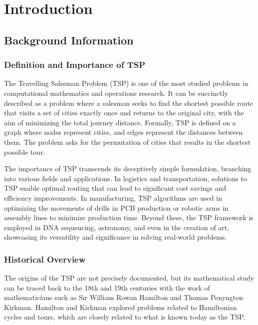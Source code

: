 \chapter{Introduction}\label{chapt:1}
\label{introduction}

\section{Background Information}

\subsection{Definition and Importance of TSP}
The Travelling Salesman Problem (TSP) is one of the most studied problems in computational mathematics and operations research. It can be succinctly described as a problem where a salesman seeks to find the shortest possible route that visits a set of cities exactly once and returns to the original city, with the aim of minimizing the total journey distance. Formally, TSP is defined on a graph where nodes represent cities, and edges represent the distances between them. The problem asks for the permutation of cities that results in the shortest possible tour.

The importance of TSP transcends its deceptively simple formulation, branching into various fields and applications. In logistics and transportation, solutions to TSP enable optimal routing that can lead to significant cost savings and efficiency improvements. In manufacturing, TSP algorithms are used in optimizing the movements of drills in PCB production or robotic arms in assembly lines to minimize production time. Beyond these, the TSP framework is employed in DNA sequencing, astronomy, and even in the creation of art, showcasing its versatility and significance in solving real-world problems.


\subsection{Historical Overview}

The origins of the TSP are not precisely documented, but its mathematical study can be traced back to the 18th and 19th centuries with the work of mathematicians such as Sir William Rowan Hamilton and Thomas Penyngton Kirkman. Hamilton and Kirkman explored problems related to Hamiltonian cycles and tours, which are closely related to what is known today as the TSP.

